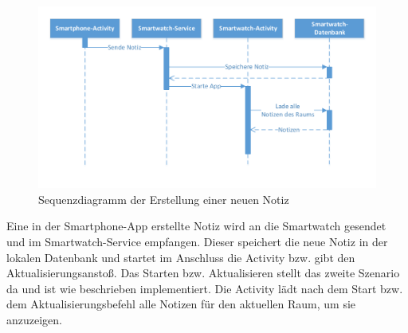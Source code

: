 \begin{figure}[H]
\centering
\includegraphics[width=1\linewidth]{../Bilder/SequenzdigrammNewNote}
\caption{Sequenzdiagramm der Erstellung einer neuen Notiz}
\label{fig:SequenzdigrammNewNote}
\end{figure}

Eine in der Smartphone-App erstellte Notiz wird an die Smartwatch gesendet und im Smartwatch-Service empfangen. Dieser speichert die neue Notiz in der lokalen Datenbank und startet im Anschluss die Activity bzw. gibt den Aktualisierungsanstoß. Das Starten bzw. Aktualisieren stellt das zweite Szenario da und ist wie beschrieben implementiert. Die Activity lädt nach dem Start bzw. dem Aktualisierungsbefehl alle Notizen für den aktuellen Raum, um sie anzuzeigen. 